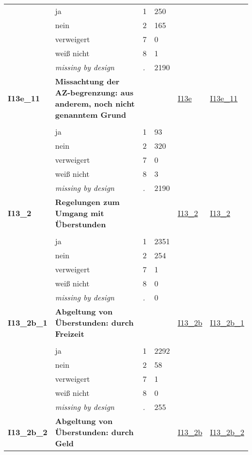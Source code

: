 \begin{longtable}{| L{2.45cm} | L{6cm} | C{1.5cm} | R{1cm} | C{2.25cm} | C{2.25cm} |}
   & ja & 1 & 250 &  &  \\ 
   & nein & 2 & 165 &  &  \\ 
   & verweigert & 7 & 0 &  &  \\ 
   & weiß nicht & 8 & 1 &  &  \\ 
   & \textit{missing by design} & \textit{.} & 2190 &  &  \\ 
   \midrule
\textbf{I13e\_11}\label{var:I13e:11} & \textbf{Missachtung der AZ-begrenzung: aus anderem, noch nicht genanntem Grund} &  &  & \hyperref[I13e]{I13e} & \hyperref[var:suf:I13e:11]{I13e\_11} \\ 
   &  &  &  &  &  \\ 
   & ja & 1 & 93 &  &  \\ 
   & nein & 2 & 320 &  &  \\ 
   & verweigert & 7 & 0 &  &  \\ 
   & weiß nicht & 8 & 3 &  &  \\ 
   & \textit{missing by design} & \textit{.} & 2190 &  &  \\ 
   \midrule
\textbf{I13\_2}\label{var:I13:2} & \textbf{Regelungen zum Umgang mit Überstunden} &  &  & \hyperref[I13:2]{I13\_2} & \hyperref[var:suf:I13:2]{I13\_2} \\ 
   &  &  &  &  &  \\ 
   & ja & 1 & 2351 &  &  \\ 
   & nein & 2 & 254 &  &  \\ 
   & verweigert & 7 & 1 &  &  \\ 
   & weiß nicht & 8 & 0 &  &  \\ 
   & \textit{missing by design} & \textit{.} & 0 &  &  \\ 
   \midrule
\textbf{I13\_2b\_1}\label{var:I13:2b:1} & \textbf{Abgeltung von Überstunden: durch Freizeit} &  &  & \hyperref[I13:2b]{I13\_2b} & \hyperref[var:suf:I13:2b:1]{I13\_2b\_1} \\ 
   &  &  &  &  &  \\ 
   & ja & 1 & 2292 &  &  \\ 
   & nein & 2 & 58 &  &  \\ 
   & verweigert & 7 & 1 &  &  \\ 
   & weiß nicht & 8 & 0 &  &  \\ 
   & \textit{missing by design} & \textit{.} & 255 &  &  \\ 
   \midrule
\textbf{I13\_2b\_2}\label{var:I13:2b:2} & \textbf{Abgeltung von Überstunden: durch Geld} &  &  & \hyperref[I13:2b]{I13\_2b} & \hyperref[var:suf:I13:2b:2]{I13\_2b\_2} \\ 

\end{longtable}
